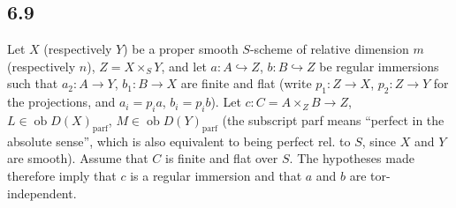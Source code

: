 \documentclass[11pt]{article}
\newcommand{\ob}{\operatorname{ob}}
\providecommand{\parf}{\mathrm{parf}}
\providecommand{\ob}{\operatorname{ob}}
\providecommand{\parf}{\mathrm{parf}}
\begin{document}
\subsection*{6.9}

Let $X$ (respectively $Y$) be a proper smooth $S$-scheme of relative dimension $m$ (respectively $n$), $Z=X\times_S Y$, and let $a:A\hookrightarrow Z$, $b:B\hookrightarrow Z$ be regular immersions such that $a_2:A\to Y$, $b_1:B\to X$ are finite and flat (write $p_1:Z\to X$, $p_2:Z\to Y$ for the projections, and $a_i=p_i a$, $b_i=p_i b$). Let $c:C=A\times_Z B\to Z$, $L\in\ob D(X)_{\parf}$, $M\in\ob D(Y)_{\parf}$ (the subscript parf means ``perfect in the absolute sense'', which is also equivalent to being perfect rel. to $S$, since $X$ and $Y$ are smooth). Assume that $C$ is finite and flat over $S$. The hypotheses made therefore imply that $c$ is a regular immersion and that $a$ and $b$ are tor-independent.
\end{document}
